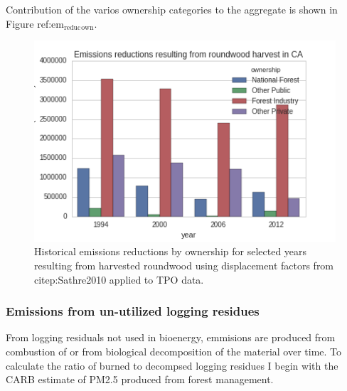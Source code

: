 \documentclass[a4paper]{article}
\begin{document}
Contribution of the varios ownership categories to the aggregate is
shown in Figure ref:em$_{\text{reduc}}$$_{\text{own}}$.

\begin{figure}[htb]
\centering
\includegraphics[width=.9\linewidth]{./graphics/harv_em_reductions.png}
\caption{\label{em_reduc_own}Historical emissions reductions by ownership for selected years resulting from harvested roundwood using displacement factors from citep:Sathre2010 applied to TPO data.}
\end{figure}


\subsubsection{Emissions from un-utilized logging residues}
\label{sec-1-3-3}

From logging residuals not used in bioenergy, emmisions are produced
from combustion of or from biological decomposition of the
material over time. To calculate the ratio of burned to decompsed
logging residues I begin with the CARB estimate of PM2.5 produced from
forest management. 
\end{document}
